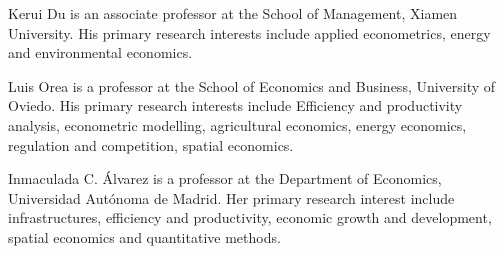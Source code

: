 %
%








\begin{aboutauthors}

Kerui Du is an associate professor at the School of Management, Xiamen University. His primary research interests include applied econometrics, energy and environmental economics.	

Luis Orea is a professor at the School of Economics and Business, University of Oviedo. His primary research interests include Efficiency and productivity analysis, econometric modelling, agricultural economics, energy economics, regulation and competition, spatial economics. 

Inmaculada C. Álvarez is a professor at the Department of Economics, Universidad Autónoma de Madrid. Her primary research interest include infrastructures, efficiency and productivity, economic growth and development, spatial economics and quantitative methods. 
	

	
\end{aboutauthors}


\endinput
